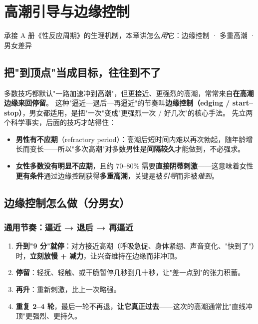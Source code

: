 
\chapter{高潮引导与边缘控制}

\begin{center}
\myhei\large 承接 A 册《性反应周期》的生理机制，本章讲怎么\emph{用}它：边缘控制 · 多重高潮 · 男女差异
\end{center}

\section{把"到顶点"当成目标，往往到不了}
多数技巧都默认"一路加速冲到高潮"，但更接近、更强烈的高潮，常常来自\textbf{在高潮边缘来回停留}。
这种"逼近—退后—再逼近"的节奏叫\textbf{边缘控制（edging / start--stop）}，男女都适用，是把"一次"变成"更强烈一次 / 好几次"的核心手法。
先立两个科学事实，后面的技巧才站得住：

\begin{itemize}[leftmargin=2em,itemsep=0.3em]
  \item \textbf{男性有不应期}（refractory period）：高潮后短时间内难以再次勃起，随年龄增长而变长——所以"多次高潮"对多数男性是\textbf{间隔较久}才能做到，不必强求。
  \item \textbf{女性多数没有明显不应期}，且约 70--80\% 需要\textbf{直接阴蒂刺激}——这意味着女性\textbf{更有条件}通过边缘控制获得\textbf{多重高潮}，关键是被\emph{引导}而非被\emph{催到}。
\end{itemize}

\section{边缘控制怎么做（分男女）}
\subsection*{通用节奏：逼近 → 退后 → 再逼近}
\begin{enumerate}[leftmargin=2em,itemsep=0.3em]
  \item \textbf{升到"9 分"就停}：对方接近高潮（呼吸急促、身体紧绷、声音变化、"快到了"）时，\textbf{立刻放慢 + 减力}，让兴奋维持在边缘而非冲顶。
  \item \textbf{停留}：轻抚、轻触、或干脆暂停几秒到几十秒，让"差一点到"的张力积蓄。
  \item \textbf{再升}：重新刺激，比上一次略强。
  \item \textbf{重复 2--4 轮}，最后一轮不再退，\textbf{让它真正过去}——这次的高潮通常比"直线冲顶"更强烈、更持久。
\end{enumerate}

